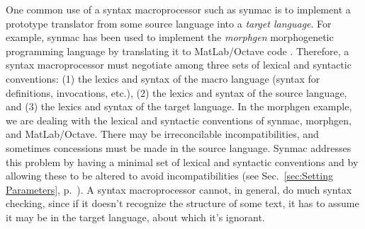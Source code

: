 \documentclass[12pt]{article}
\begin{document}
One common use of a syntax macroprocessor such as synmac is to implement a prototype translator from some source language into a \emph{target language}.
For example, synmac has been used to implement the \emph{morphgen} morphogenetic programming language by translating it to MatLab/Octave code \cite{CF2D-TR}.
Therefore, a syntax macroprocessor must negotiate among three sets of lexical and syntactic conventions:
(1) the lexics and syntax of the macro language (syntax for definitions, invocations, etc.),
(2) the lexics and syntax of the source language,
and (3) the lexics and syntax of the target language.
In the morphgen example, we are dealing with the lexical and syntactic conventions of synmac, morphgen, and MatLab/Octave.
There may be irreconcilable incompatibilities, and sometimes concessions must be made in the source language.
Synmac addresses this problem by having a minimal set of lexical and syntactic conventions and by allowing these to be altered to avoid incompatibilities (see Sec.\ \ref{sec:Setting Parameters}, p.\ \pageref{sec:Setting Parameters}).
A syntax macroprocessor cannot, in general, do much syntax checking, since if it doesn't recognize the structure of some text, it has to assume it may be in the target language, about which it's ignorant.
\end{document}
